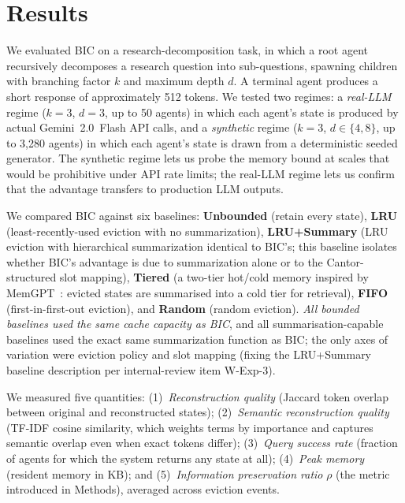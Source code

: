 \documentclass[fleqn,10pt]{article}
\theoremstyle{definition}
\newcommand{\preserv}{\rho}
\begin{document}
\section*{Results}

We evaluated BIC on a research-decomposition task, in which a root
agent recursively decomposes a research question into sub-questions,
spawning children with branching factor $k$ and maximum depth $d$. A
terminal agent produces a short response of approximately 512 tokens.
We tested two regimes: a \emph{real-LLM} regime ($k{=}3$, $d{=}3$,
up to 50 agents) in which each agent's state is produced by actual
Gemini~2.0~Flash API calls, and a \emph{synthetic} regime ($k{=}3$,
$d{\in}\{4, 8\}$, up to 3,280 agents) in which each agent's state is
drawn from a deterministic seeded generator. The synthetic regime
lets us probe the memory bound at scales that would be prohibitive
under API rate limits; the real-LLM regime lets us confirm that the
advantage transfers to production LLM outputs.

We compared BIC against six baselines:
\textbf{Unbounded} (retain every state),
\textbf{LRU} (least-recently-used eviction with no summarization),
\textbf{LRU+Summary} (LRU eviction with hierarchical summarization
identical to BIC's; this baseline isolates whether BIC's advantage is
due to summarization alone or to the Cantor-structured slot mapping),
\textbf{Tiered} (a two-tier hot/cold memory inspired by
MemGPT~\citep{packer2023memgpt}: evicted states are summarised into a
cold tier for retrieval),
\textbf{FIFO} (first-in-first-out eviction), and
\textbf{Random} (random eviction).
\emph{All bounded baselines used the same cache capacity as BIC}, and
all summarisation-capable baselines used the exact same summarization
function as BIC; the only axes of variation were eviction policy and
slot mapping (fixing the LRU+Summary baseline description per
internal-review item W-Exp-3).

We measured five quantities:
(1)~\emph{Reconstruction quality} (Jaccard token overlap between
original and reconstructed states);
(2)~\emph{Semantic reconstruction quality} (TF-IDF cosine similarity,
which weights terms by importance and captures semantic overlap even
when exact tokens differ);
(3)~\emph{Query success rate} (fraction of agents for which the system
returns any state at all);
(4)~\emph{Peak memory} (resident memory in KB); and
(5)~\emph{Information preservation ratio} $\preserv$ (the metric
introduced in Methods), averaged across eviction events.
\end{document}
